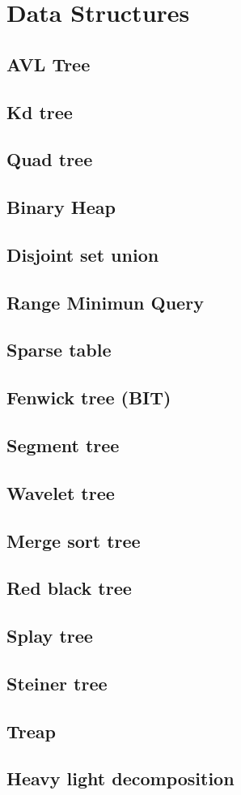 
\section{Data Structures}
\subsection{AVL Tree}
\subsection{Kd tree}
\subsection{Quad tree}
\subsection{Binary Heap}
\subsection{Disjoint set union}
\subsection{Range Minimun Query}
\subsection{Sparse table}
\subsection{Fenwick tree (BIT) }
\subsection{Segment tree}
\subsection{Wavelet tree}
\subsection{Merge sort tree}
\subsection{Red black tree}
\subsection{Splay tree}
\subsection{Steiner tree}
\subsection{Treap}
\subsection{Heavy light decomposition}
